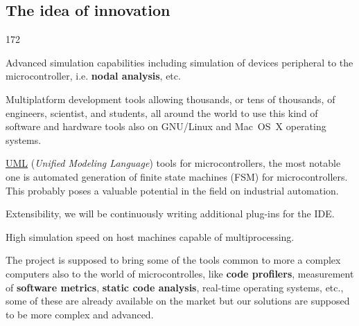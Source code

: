 \documentclass[a4paper,twoside,15pt]{book}
\begin{document}
        \subsection{The idea of innovation}
            \begin{dingautolist}{172}
                \item Advanced simulation capabilities including simulation of devices peripheral to the microcontroller, i.e. \textbf{nodal analysis}, etc.
                \item Multiplatform development tools allowing thousands, or tens of thousands, of engineers, scientist, and students, all around the world to use this kind of software and hardware tools also on GNU/Linux and Mac~OS~X operating systems.
                \item \href{http://en.wikipedia.org/wiki/Unified_Modeling_Language}{UML} (\textit{Unified Modeling Language}) tools for microcontrollers, the most notable one is automated generation of finite state machines (FSM) for microcontrollers. This probably poses a valuable potential in the field on industrial automation.
                \item Extensibility, we will be continuously writing additional plug-ins for the IDE.
                \item High simulation speed on host machines capable of multiprocessing.
                \item The project is supposed to bring some of the tools common to more a complex computers also to the world of microcontrolles, like \textbf{code profilers}, measurement of \textbf{software metrics}, \textbf{static code analysis}, real-time operating systems, etc., some of these are already available on the market but our solutions are supposed to be more complex and advanced.
            \end{dingautolist}
\end{document}
